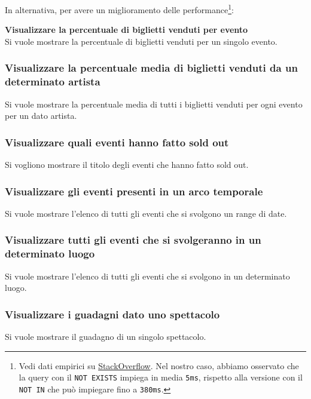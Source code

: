 \documentclass[a4paper,11pt]{article}
\begin{document}
In alternativa, per avere un miglioramento delle performance\footnote{
Vedi dati empirici su \href{https://stackoverflow.com/a/66785790}{StackOverflow}.
Nel nostro caso, abbiamo osservato che la query con il \texttt{NOT EXISTS}
impiega in media \texttt{5ms}, rispetto alla versione con il \texttt{NOT IN}
che può impiegare fino a \texttt{380ms}.}:


\textbf{Visualizzare la percentuale di biglietti venduti per evento}\\
Si vuole mostrare la percentuale di biglietti venduti per un singolo evento.


\subsubsection{Visualizzare la percentuale media di biglietti venduti da un determinato artista}
Si vuole mostrare la percentuale media di tutti i biglietti venduti per ogni
evento per un dato artista.


\subsubsection{Visualizzare quali eventi hanno fatto sold out}
Si vogliono mostrare il titolo degli eventi che hanno fatto sold out.

 
\subsubsection{Visualizzare gli eventi presenti in un arco temporale}
Si vuole mostrare l'elenco di tutti gli eventi che si svolgono un range di date.


\subsubsection{Visualizzare tutti gli eventi che si svolgeranno in un determinato luogo}
Si vuole mostrare l'elenco di tutti gli eventi che si svolgono in un determinato luogo.


\subsubsection{Visualizzare i guadagni dato uno spettacolo}
Si vuole mostrare il guadagno di un singolo spettacolo.

\end{document}
